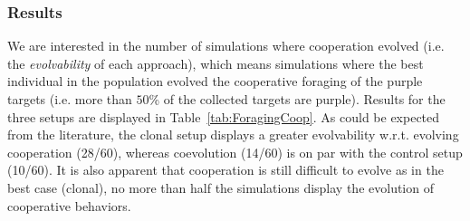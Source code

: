   \subsubsection{Results}

  \begin{table}[hbtp]
    \caption{Number of simulations where the best individual evolved a cooperative strategy (collecting purple targets) or a solitary strategy (collecting green targets) for each setup in the foraging task.}
    \label{tab:ForagingCoop}
  \end{table}

  We are interested in the number of simulations where cooperation evolved (i.e. the \emph{evolvability} of each approach), which means simulations where the best individual in the population evolved the cooperative foraging of the purple targets (i.e. more than $50$\% of the collected targets are purple). Results for the three setups are displayed in Table~\ref{tab:ForagingCoop}. As could be expected from the literature, the clonal setup displays a greater evolvability w.r.t. evolving cooperation (28/60), whereas coevolution (14/60) is on par with the control setup (10/60). It is also apparent that cooperation is still difficult to evolve as in the best case (clonal), no more than half the simulations display the evolution of cooperative behaviors.


